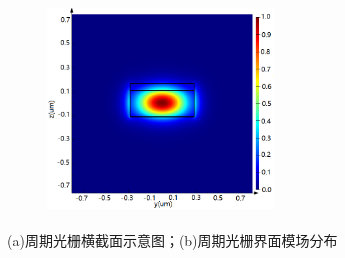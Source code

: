 \documentclass[UTF8,a4paper,12pt]{ctexart}
\numberwithin{equation}{section}
\begin{document}
\begin{figure}[htbp]
\begin{subfigure}[b]{0.4\textwidth}
\begin{tikzpicture}[x=1.1pt,y=1pt,yscale=-1,xscale=1]
\end{tikzpicture}
\subcaption{}
\end{subfigure}%
\hfill
\begin{subfigure}[b]{0.45\textwidth}
\centering
\includegraphics[height=5.5cm,width=6cm]{fig5.png}
\subcaption{}
\end{subfigure}%
\caption{(a)周期光栅横截面示意图；(b)周期光栅界面模场分布}
\label{3-3}
\end{figure}
\end{document}
